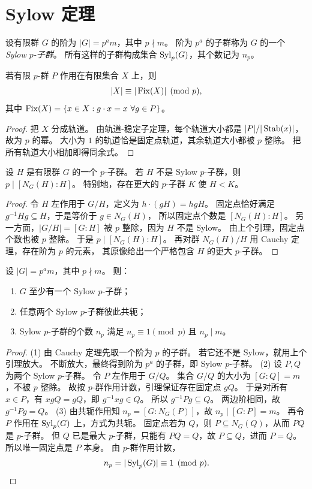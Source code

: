 \section{Sylow 定理}
\begin{definition}
设有限群 $G$ 的阶为 $|G|=p^am$，其中 $p\nmid m$。
阶为 $p^a$ 的子群称为 $G$ 的一个 \emph{Sylow $p$-子群}。
所有这样的子群构成集合 $\operatorname{Syl}_p(G)$，其个数记为 $n_p$。
\end{definition}
\begin{lemma}[$p$-群作用计数]
若有限 $p$-群 $P$ 作用在有限集合 $X$ 上，则
\[
|X|\equiv |\operatorname{Fix}(X)|\pmod p,
\]
其中 $\operatorname{Fix}(X)=\{x\in X:g\cdot x=x\ \forall g\in P\}$。
\end{lemma}
\begin{proof}
把 $X$ 分成轨道。
由轨道-稳定子定理，每个轨道大小都是 $|P|/|\operatorname{Stab}(x)|$，故为 $p$ 的幂。
大小为 $1$ 的轨道恰是固定点轨道，其余轨道大小都被 $p$ 整除。
把所有轨道大小相加即得同余式。
\end{proof}
\begin{lemma}[正规化子放大]
设 $H$ 是有限群 $G$ 的一个 $p$-子群。
若 $H$ 不是 Sylow $p$-子群，则 $p\mid [N_G(H):H]$。
特别地，存在更大的 $p$-子群 $K$ 使 $H<K$。
\end{lemma}
\begin{proof}
令 $H$ 左作用于 $G/H$，定义为 $h\cdot(gH)=hgH$。
固定点恰好满足 $g^{-1}Hg\subseteq H$，于是等价于 $g\in N_G(H)$，
所以固定点个数是 $[N_G(H):H]$。
另一方面，$|G/H|=[G:H]$ 被 $p$ 整除，因为 $H$ 不是 Sylow。
由上个引理，固定点个数也被 $p$ 整除。
于是 $p\mid[N_G(H):H]$。
再对群 $N_G(H)/H$ 用 Cauchy 定理，存在阶为 $p$ 的元素，
其原像给出一个严格包含 $H$ 的更大 $p$-子群。
\end{proof}
\begin{theorem}
设 $|G|=p^am$，其中 $p\nmid m$。
则：
\begin{enumerate}[label=\textnormal{(\arabic*)}, leftmargin=3em]
  \item $G$ 至少有一个 Sylow $p$-子群；
  \item 任意两个 Sylow $p$-子群彼此共轭；
  \item Sylow $p$-子群的个数 $n_p$ 满足 $n_p\equiv1\pmod p$ 且 $n_p\mid m$。
\end{enumerate}
\end{theorem}
\begin{proof}
(1) 由 Cauchy 定理先取一个阶为 $p$ 的子群。
若它还不是 Sylow，就用上个引理放大。
不断放大，最终得到阶为 $p^a$ 的子群，即 Sylow $p$-子群。
(2) 设 $P,Q$ 为两个 Sylow $p$-子群。
令 $P$ 左作用于 $G/Q$。
集合 $G/Q$ 的大小为 $[G:Q]=m$，不被 $p$ 整除。
故按 $p$-群作用计数，引理保证存在固定点 $gQ$。
于是对所有 $x\in P$，有 $xgQ=gQ$，即 $g^{-1}xg\in Q$。
所以 $g^{-1}Pg\subseteq Q$。
两边阶相同，故 $g^{-1}Pg=Q$。
(3) 由共轭作用知 $n_p=[G:N_G(P)]$，故 $n_p\mid [G:P]=m$。
再令 $P$ 作用在 $\operatorname{Syl}_p(G)$ 上，方式为共轭。
固定点若为 $Q$，则 $P\subseteq N_G(Q)$，从而 $PQ$ 是 $p$-子群。
但 $Q$ 已是最大 $p$-子群，只能有 $PQ=Q$，故 $P\subseteq Q$，进而 $P=Q$。
所以唯一固定点是 $P$ 本身。
由 $p$-群作用计数，
\[
 n_p=|\operatorname{Syl}_p(G)|\equiv1\pmod p.
\]
\end{proof}
